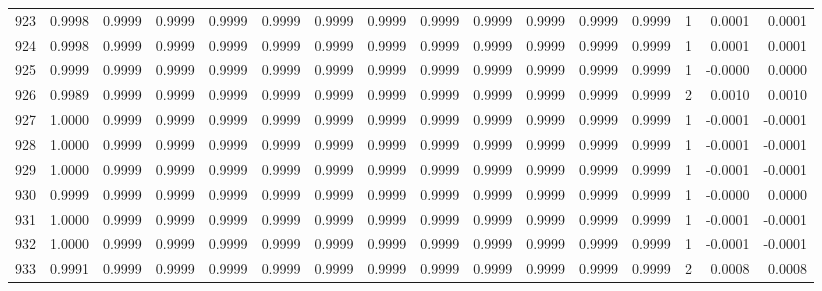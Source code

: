 \begin{tabular}{lrrrrrrrrrrrrrrr}
923 &      0.9998 &  0.9999 &  0.9999 &  0.9999 &  0.9999 &  0.9999 &  0.9999 &  0.9999 &  0.9999 &  0.9999 &   0.9999 &     0.9999 &      1 &                    0.0001 &                     0.0001 \\
924 &      0.9998 &  0.9999 &  0.9999 &  0.9999 &  0.9999 &  0.9999 &  0.9999 &  0.9999 &  0.9999 &  0.9999 &   0.9999 &     0.9999 &      1 &                    0.0001 &                     0.0001 \\
925 &      0.9999 &  0.9999 &  0.9999 &  0.9999 &  0.9999 &  0.9999 &  0.9999 &  0.9999 &  0.9999 &  0.9999 &   0.9999 &     0.9999 &      1 &                   -0.0000 &                     0.0000 \\
926 &      0.9989 &  0.9999 &  0.9999 &  0.9999 &  0.9999 &  0.9999 &  0.9999 &  0.9999 &  0.9999 &  0.9999 &   0.9999 &     0.9999 &      2 &                    0.0010 &                     0.0010 \\
927 &      1.0000 &  0.9999 &  0.9999 &  0.9999 &  0.9999 &  0.9999 &  0.9999 &  0.9999 &  0.9999 &  0.9999 &   0.9999 &     0.9999 &      1 &                   -0.0001 &                    -0.0001 \\
928 &      1.0000 &  0.9999 &  0.9999 &  0.9999 &  0.9999 &  0.9999 &  0.9999 &  0.9999 &  0.9999 &  0.9999 &   0.9999 &     0.9999 &      1 &                   -0.0001 &                    -0.0001 \\
929 &      1.0000 &  0.9999 &  0.9999 &  0.9999 &  0.9999 &  0.9999 &  0.9999 &  0.9999 &  0.9999 &  0.9999 &   0.9999 &     0.9999 &      1 &                   -0.0001 &                    -0.0001 \\
930 &      0.9999 &  0.9999 &  0.9999 &  0.9999 &  0.9999 &  0.9999 &  0.9999 &  0.9999 &  0.9999 &  0.9999 &   0.9999 &     0.9999 &      1 &                   -0.0000 &                     0.0000 \\
931 &      1.0000 &  0.9999 &  0.9999 &  0.9999 &  0.9999 &  0.9999 &  0.9999 &  0.9999 &  0.9999 &  0.9999 &   0.9999 &     0.9999 &      1 &                   -0.0001 &                    -0.0001 \\
932 &      1.0000 &  0.9999 &  0.9999 &  0.9999 &  0.9999 &  0.9999 &  0.9999 &  0.9999 &  0.9999 &  0.9999 &   0.9999 &     0.9999 &      1 &                   -0.0001 &                    -0.0001 \\
933 &      0.9991 &  0.9999 &  0.9999 &  0.9999 &  0.9999 &  0.9999 &  0.9999 &  0.9999 &  0.9999 &  0.9999 &   0.9999 &     0.9999 &      2 &                    0.0008 &                     0.0008 \\

\end{tabular}
